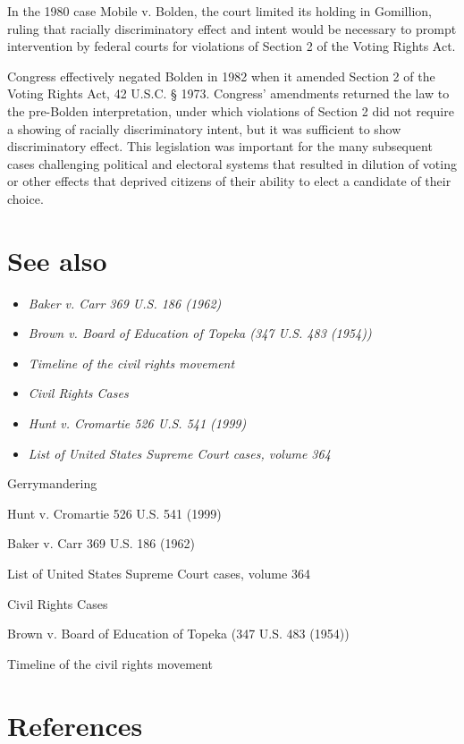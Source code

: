 In the 1980 case Mobile v. Bolden, the court limited its holding in
Gomillion, ruling that racially discriminatory effect and intent would
be necessary to prompt intervention by federal courts for violations of
Section 2 of the Voting Rights Act.

Congress effectively negated Bolden in 1982 when it amended Section 2 of
the Voting Rights Act, 42 U.S.C. § 1973. Congress' amendments returned
the law to the pre-Bolden interpretation, under which violations of
Section 2 did not require a showing of racially discriminatory intent,
but it was sufficient to show discriminatory effect. This legislation
was important for the many subsequent cases challenging political and
electoral systems that resulted in dilution of voting or other effects
that deprived citizens of their ability to elect a candidate of their
choice.

\section{See also}\label{see-also}

\begin{itemize}
\item
  \emph{Baker v. Carr 369 U.S. 186 (1962)}
\item
  \emph{Brown v. Board of Education of Topeka (347 U.S. 483 (1954))}
\item
  \emph{Timeline of the civil rights movement}
\item
  \emph{Civil Rights Cases}
\item
  \emph{Hunt v. Cromartie 526 U.S. 541 (1999)}
\item
  \emph{List of United States Supreme Court cases, volume 364}
\end{itemize}

Gerrymandering

Hunt v. Cromartie 526 U.S. 541 (1999)

Baker v. Carr 369 U.S. 186 (1962)

List of United States Supreme Court cases, volume 364

Civil Rights Cases

Brown v. Board of Education of Topeka (347 U.S. 483 (1954))

Timeline of the civil rights movement

\section{References}\label{references}

